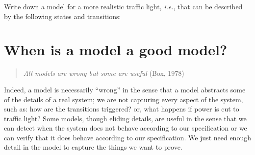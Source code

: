 \documentclass{article}
\theoremstyle{definition}
\newcommand{\ie}{\emph{i.e.}}
\begin{document}
\begin{exc}
Write down a model for a more realistic traffic light, \ie{}, that can
be described by the following states and transitions:
%
\begin{center}
\end{center}
\end{exc}

\section{When is a model a good model?}
\label{subsec:whenisamodelgood}

\begin{quote}
\emph{All models are wrong but some are useful} (Box, 1978)
\end{quote}

\noindent
Indeed, a model is necessarily ``wrong'' in the sense that a model
abstracts some of the details of a real system; we are not
capturing every aspect of the system, such as: how are the transitions
triggered? or, what happens if power is cut to traffic light? Some
models, though eliding details, are useful in the sense that we
can detect when the system does not behave according to our
specification or we can verify that it does behave according to our
specification. We just need enough detail in the model to capture the
things we want to prove.
\end{document}
